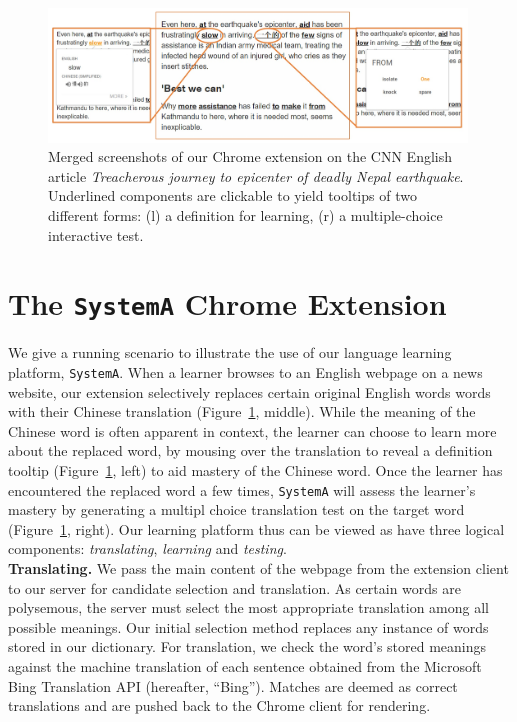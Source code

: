 \begin{figure}[ht]
\centering
\includegraphics[width=0.99\textwidth]{chrome_extension.jpg}
\caption{Merged screenshots of our Chrome extension on the CNN English
  article {\it Treacherous journey to epicenter of deadly Nepal
    earthquake}.  Underlined components are clickable to yield
  tooltips of two different forms: (l) a definition for learning, (r)
  a multiple-choice interactive test.}
\label{fig:chrome_extension_1}
\end{figure}

\section{The {\tt SystemA} Chrome Extension}


We give a running scenario to illustrate the use of our language
learning platform, {\tt SystemA}.  When a learner browses to an
English webpage on a news website, our extension selectively replaces
certain original English words words with their Chinese translation
(Figure~\ref{fig:chrome_extension_1}, middle).  While the meaning of
the Chinese word is often apparent in context, the learner can choose
to learn more about the replaced word, by mousing over the translation
to reveal a definition tooltip (Figure~\ref{fig:chrome_extension_1},
left) to aid mastery of the Chinese word.  Once the learner has
encountered the replaced word a few times, {\tt SystemA} will assess
the learner's mastery by generating a multipl choice translation test
on the target word (Figure~\ref{fig:chrome_extension_1}, right).  Our
learning platform thus can be viewed as have three logical components:
{\it translating}, {\it learning} and {\it testing}. \\

{\bf Translating.}  We pass the main content of the webpage from the
extension client to our server for candidate selection and
translation.  As certain words are polysemous, the server must select
the most appropriate translation among all possible meanings.  Our
initial selection method replaces any instance of words stored in our
dictionary.  For translation, we check the word's stored meanings
against the machine translation of each sentence obtained from the
Microsoft Bing Translation API (hereafter, ``Bing'').  Matches are
deemed as correct translations and are pushed back to the Chrome
client for rendering.

